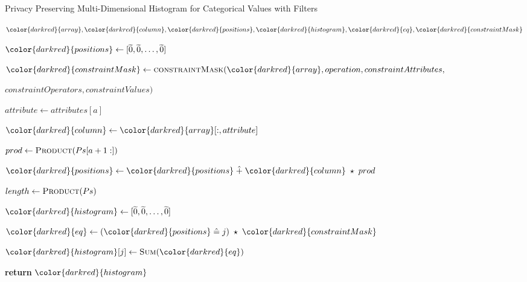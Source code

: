 \begin{algorithm}[H]
\caption{Privacy Preserving Multi-Dimensional Histogram for Categorical Values with Filters}\label{a:filters-2d-histogram}
\begin{algorithmic}[1]
  \renewcommand{\algorithmicrequire}{\textbf{Private Vars:}}
  \Require ${\color{darkred}{array}}, {\color{darkred}{column}}, {\color{darkred}{positions}}, {\color{darkred}{histogram}}, {\color{darkred}{eq}}, {\color{darkred}{constraintMask}}$


      \State
      ${\color{darkred}{positions}} \gets [\enc{0}, \enc{0}, \dots, \enc{0}] $

      \State ${\color{darkred}{constraintMask}} \gets \textsc{constraintMask}({\color{darkred}{array}}, operation, constraintAttributes, $\par\hfill$ constraintOperators, constraintValues)$


        \State $attribute \gets attributes[a]$

        \State ${\color{darkred}{column}} \gets {\color{darkred}{array}}[:, attribute]$ 

        \State $prod \gets \textsc{Product}(Ps[a+1:])$ 

        \State ${\color{darkred}{positions}} \gets {\color{darkred}{positions}} \hplus {\color{darkred}{column}} \hmul prod$

      \EndFor

      \State $length \gets \textsc{Product}(Ps)$

      \State ${\color{darkred}{histogram}} \gets [\enc{0}, \enc{0}, \dots, \enc{0}]$



        \State ${\color{darkred}{eq}} \gets ({\color{darkred}{positions}} \heq j) \hmul {\color{darkred}{constraintMask}}$

        \State ${\color{darkred}{histogram}}[j] \gets \textsc{Sum}({\color{darkred}{eq}})$

      \EndFor

      \State \textbf{return} {${\color{darkred}{histogram}}$}
  \EndProcedure

\end{algorithmic}
\end{algorithm}
